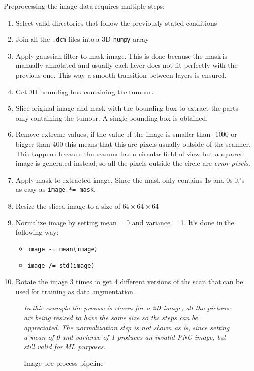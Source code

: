 Preprocessing the image data requires multiple steps:
\begin{enumerate}
  \item Select valid directories that follow the previously stated conditions
  \item Join all the \verb|.dcm| files into a 3D \verb|numpy| array
  \item Apply gaussian filter to mask image. This is done because the mask is manually annotated
        and usually each layer does not fit perfectly with the previous one. This way a smooth
        transition between layers is ensured.
  \item Get 3D bounding box containing the tumour.
  \item Slice original image and mask with the bounding box to extract the parts only containing
        the tumour. A single bounding box is obtained.
  \item Remove extreme values, if the value of the image is smaller than -1000 or bigger than
        400 this means that this are pixels usually outside of the scanner. This happens because
        the scanner has a circular field of view but a squared image is generated instead, so 
        all the pixels outside the circle are \emph{error pixels}.
  \item Apply mask to extracted image. Since the mask only contains 1s and 0s it's as easy 
        as \verb|image *= mask|.
  \item Resize the sliced image to a size of \( 64 \times 64 \times 64 \)
  \item Normalize image by setting mean = 0 and variance = 1. It's done in the following way:
  \begin{itemize}
    \item \verb|image -= mean(image)|
    \item \verb|image /= std(image)|
  \end{itemize}
  \item Rotate the image 3 times to get 4 different versions of the scan that can be used for 
        training as data augmentation.
\end{enumerate}

\begin{figure}
  \resizebox{\textwidth}{.7\textwidth}{
    
  }

  \caption{Image pre-process pipeline \label{fig:preprocess}}

  \itshape\justify
  In this example the process is shown for a 2D image, all the pictures are being resized to 
  have the same size so the steps can be appreciated. The normalization step is not shown as is,
  since setting a mean of 0 and variance of 1 produces an invalid \acrshort{PNG} image, but still valid
  for \gls{ML} purposes.
\end{figure}

